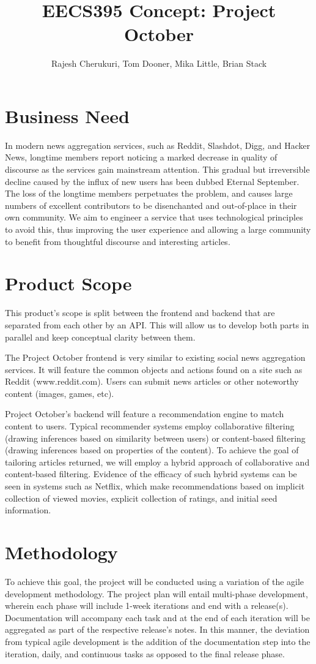 \documentclass{article}
\author{Rajesh Cherukuri, Tom Dooner, Mika Little, Brian Stack}
\title{EECS395 Concept: Project October}
\begin{document}
\maketitle

\section{Business Need}
In modern news aggregation services, such as Reddit, Slashdot, Digg, and Hacker News, longtime members report noticing a marked decrease in quality of discourse as the services gain mainstream attention.
This gradual but irreversible decline caused by the influx of new users has been dubbed Eternal September.
The loss of the longtime members perpetuates the problem, and causes large numbers of excellent contributors to be disenchanted and out-of-place in their own community.
We aim to engineer a service that uses technological principles to avoid this, thus improving the user experience and allowing a large community to benefit from thoughtful discourse and interesting articles.

\section{Product Scope}
This product's scope is split between the frontend and backend that are separated from each other by an API.
This will allow us to develop both parts in parallel and keep conceptual clarity between them.

The Project October frontend is very similar to existing social news aggregation services.
It will feature the common objects and actions found on a site such as Reddit (www.reddit.com).
Users can submit news articles or other noteworthy content (images, games, etc).

Project October's backend will feature a recommendation engine to match content to users.
Typical recommender systems employ collaborative filtering (drawing inferences based on similarity between users) or content-based filtering (drawing inferences based on properties of the content).
To achieve the goal of tailoring articles returned, we will employ a hybrid approach of collaborative and content-based filtering.
Evidence of the efficacy of such hybrid systems can be seen in systems such as Netflix, which make recommendations based on implicit collection of viewed movies, explicit collection of ratings, and initial seed information.

\section{Methodology}
To achieve this goal, the project will be conducted using a variation of  the agile development methodology.
The project plan will entail multi-phase development, wherein each phase will include 1-week  iterations and end with a release(s).
Documentation will accompany each task and at the end of each iteration will be aggregated as part of the respective release’s notes.
In this manner, the deviation from typical agile development is the addition of the documentation step into the iteration, daily, and continuous tasks as opposed to the final release phase.
\end{document}
